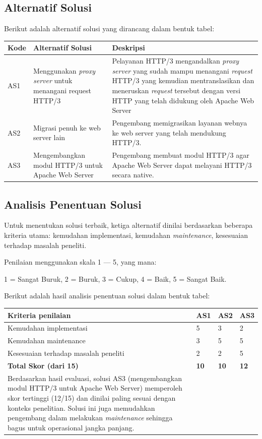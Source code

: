 \subsection{Alternatif Solusi}
Berikut adalah alternatif solusi yang dirancang dalam bentuk tabel:
\begin{table}[h]
\begin{tabular}{|p{}|p{}|p{}|}
\hline
\textbf{Kode} & \textbf{Alternatif Solusi} & \textbf{Deskripsi} \\
\hline
AS1 & Menggunakan \textit{proxy server} untuk menangani request HTTP/3 & Pelayanan HTTP/3 mengandalkan \textit{proxy server} yang sudah mampu menangani \textit{request} HTTP/3 yang kemudian mentranslasikan dan meneruskan \textit{request} tersebut dengan versi HTTP yang telah didukung oleh Apache Web Server \\
\hline
AS2 & Migrasi penuh ke web server lain & Pengembang memigrasikan layanan webnya ke web server yang telah mendukung HTTP/3. \\
\hline
AS3 & Mengembangkan modul HTTP/3 untuk Apache Web Server & Pengembang membuat modul HTTP/3 agar Apache Web Server dapat melayani HTTP/3 secara native. \\
\hline
\end{tabular}
\end{table}
\subsection{Analisis Penentuan Solusi}

Untuk menentukan solusi terbaik, ketiga alternatif dinilai berdasarkan beberapa kriteria utama: kemudahan implementasi, kemudahan \textit{maintenance}, kesesuaian terhadap masalah peneliti.

Penilaian menggunakan skala 1 --- 5, yang mana:

1 = Sangat Buruk, 2 = Buruk, 3 = Cukup, 4 = Baik, 5 = Sangat Baik.

Berikut adalah hasil analisis penentuan solusi dalam bentuk tabel:

\begin{table}[h]
\begin{tabular}{|l|l|l|l|}
\hline
\textbf{Kriteria penilaian} & \textbf{AS1} & \textbf{AS2} & \textbf{AS3} \\
\hline
Kemudahan implementasi & 5 & 3 & 2 \\
\hline
Kemudahan maintenance & 3 & 5 & 5 \\
\hline
Kesesuaian terhadap masalah peneliti & 2 & 2 & 5 \\
\hline
\textbf{Total Skor (dari 15)} & \textbf{10} & \textbf{10} & \textbf{12} \\
\hline


Berdasarkan hasil evaluasi, solusi AS3 (mengembangkan modul HTTP/3 untuk Apache Web Server) memperoleh skor tertinggi (12/15) dan dinilai paling sesuai dengan konteks penelitian. Solusi ini juga memudahkan pengembang dalam melakukan \textit{maintenance} sehingga bagus untuk operasional jangka panjang.

\end{tabular}
\end{table}